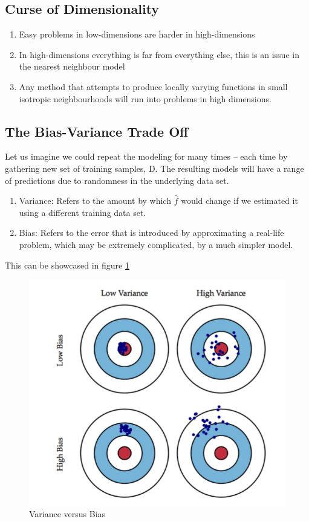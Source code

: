 \documentclass[12pt]{article}
\numberwithin{equation}{section}
\begin{document}
\subsection{Curse of Dimensionality}
\begin{enumerate}
    \item Easy problems in low-dimensions are harder in high-dimensions
    \item In high-dimensions everything is far from everything else, this is an issue in the nearest neighbour model
    \item Any method that attempts to produce locally varying functions in small isotropic neighbourhoods will run into problems in high dimensions.
\end{enumerate}
\subsection{The Bias-Variance Trade Off}
Let us imagine we could repeat the modeling for many times – each time by gathering new set of training samples, D. The resulting models will have a range of predictions due to randomness in the underlying data set.
\begin{enumerate}
    \item Variance: Refers to the amount by which $\hat{f}$ would change if we estimated it using a different training data set.
    \item Bias: Refers to the error that is introduced by approximating a real-life problem, which may be extremely complicated, by a much simpler model.
\end{enumerate}
This can be showcased in figure \ref{var_bias}
\begin{figure}[!ht]
    \centering
    \includegraphics[scale = 0.7]{var_bias.png}
    \caption{Variance versus Bias}
    \label{var_bias}
\end{figure}
\end{document}
